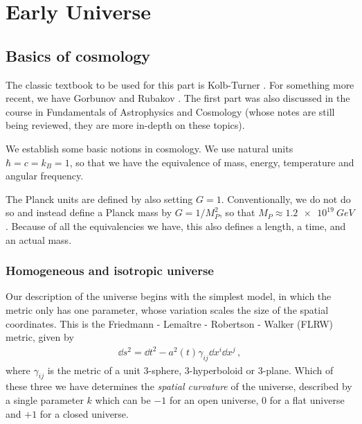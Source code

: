 \documentclass[main.tex]{subfiles}
\begin{document}
\chapter{Early Universe}

\section{Basics of cosmology}


The classic textbook to be used for this part is Kolb-Turner \cite[]{kolbEarlyUniverse1994}.
For something more recent, we have Gorbunov and Rubakov \cite[]{gorbunovIntroductionTheoryEarly2011}.
The first part was also discussed in the course in Fundamentals of Astrophysics and Cosmology (whose notes are still being reviewed, they are more in-depth on these topics).

We establish some basic notions in cosmology. We use natural units \(\hbar = c = k_B = 1\), so that we have the equivalence of mass, energy, temperature and angular frequency. 

The Planck units are defined by also setting \(G =1\). 
Conventionally, we do not do so and instead define a Planck mass by \(G = 1 / M_P^2\), so that \(M_P \approx \SI{1.2e19}{GeV}\).
Because of all the equivalencies we have, this also defines a length, a time, and an actual mass. 

\subsection{Homogeneous and isotropic universe}

Our description of the universe begins with the simplest model, in which the metric only has one parameter, whose variation scales the size of the spatial coordinates. This is the Friedmann - Lemaître - Robertson - Walker (FLRW) metric, given by 
%
\begin{align}
\dd{s^2} = \dd{t}^2  - a^2(t) \gamma_{ij} \dd{x^{i}} \dd{x^{j}}
\,,
\end{align}
%
where \(\gamma_{ij}\) is the metric of a unit 3-sphere, 3-hyperboloid or 3-plane.
Which of these three we have determines the \emph{spatial curvature} of the universe, described by a single parameter \(k\) which can be \(-1\) for an open universe, \(0\) for a flat universe and \(+1\) for a closed universe.
\end{document}
